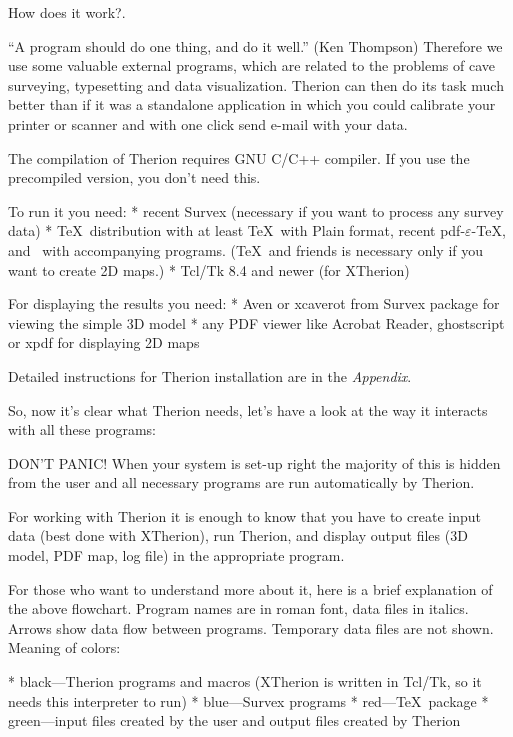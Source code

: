\subchapter How does it work?.

``A program should do one thing, and do it well.'' (Ken Thompson) 
Therefore we use some valuable external programs, which are related to the problems of cave 
surveying, typesetting and data visualization. Therion can then do its task 
much better than if it was a standalone application in which you could calibrate 
your printer or scanner and with one click send e-mail with your data.

The compilation of Therion requires GNU C/C++ compiler. 
If you use the precompiled version, you don't need this.

To run it you need:
\list
* recent Survex (necessary if you want to process any survey data)
* \TeX\ distribution with at least \TeX\ with Plain format, 
  recent pdf-$\varepsilon$-\TeX, and \MP\ with accompanying programs. 
  (\TeX\ and friends is necessary only if you want to create 2D maps.)
* Tcl/Tk 8.4 and newer (for XTherion)
\endlist

For displaying the results you need:
\list
* Aven or xcaverot from Survex package for viewing the simple 3D model
* any PDF viewer like Acrobat Reader, ghostscript or xpdf for displaying  
  2D maps
\endlist

Detailed instructions for Therion installation are in the {\it Appendix}.

So, now it's clear what Therion needs, let's have a look at the way 
it interacts with all these programs:


DON'T PANIC! When your system is set-up right the majority of this is hidden from 
the user and all necessary programs are run automatically by Therion. 

For working with Therion it is enough to know that you have to create input data 
(best done with XTherion), run Therion, and display output files 
(3D model, PDF map, log file) in the appropriate program. 

For those who want to understand more about it, here is a brief explanation of 
the above flowchart. Program names are in roman font, data files in italics. 
Arrows show data flow between programs. Temporary data files are not shown. 
Meaning of colors:

\list
* black---Therion programs and macros (XTherion is written in Tcl/Tk,
  so it needs this interpreter to run)
* blue---Survex programs
* red---\TeX\ package
* green---input files created by the user and output files created by Therion
\endlist

